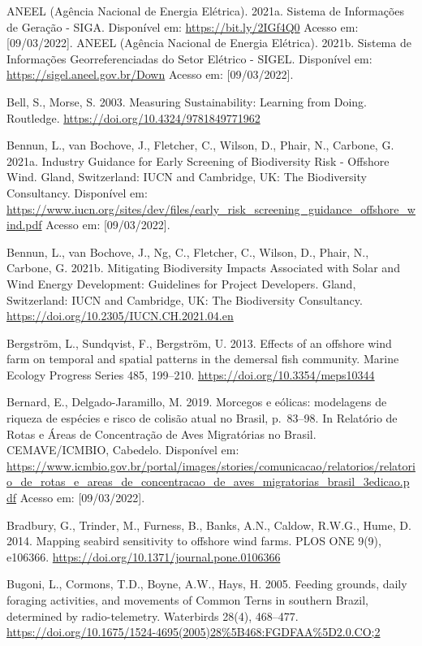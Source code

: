 \documentclass[
  oneside]{scrbook}
\begin{document}
ANEEL (Agência Nacional de Energia Elétrica). 2021a. Sistema de Informações de Geração - SIGA. Disponível em: \url{https://bit.ly/2IGf4Q0} Acesso em: {[}09/03/2022{]}.
ANEEL (Agência Nacional de Energia Elétrica). 2021b. Sistema de Informações Georreferenciadas do Setor Elétrico - SIGEL. Disponível em: \url{https://sigel.aneel.gov.br/Down} Acesso em: {[}09/03/2022{]}.

Bell, S., Morse, S. 2003. Measuring Sustainability: Learning from Doing. Routledge. \url{https://doi.org/10.4324/9781849771962}

Bennun, L., van Bochove, J., Fletcher, C., Wilson, D., Phair, N., Carbone, G. 2021a. Industry Guidance for Early Screening of Biodiversity Risk - Offshore Wind. Gland, Switzerland: IUCN and Cambridge, UK: The Biodiversity Consultancy. Disponível em: \url{https://www.iucn.org/sites/dev/files/early_risk_screening_guidance_offshore_wind.pdf} Acesso em: {[}09/03/2022{]}.

Bennun, L., van Bochove, J., Ng, C., Fletcher, C., Wilson, D., Phair, N., Carbone, G. 2021b. Mitigating Biodiversity Impacts Associated with Solar and Wind Energy Development: Guidelines for Project Developers. Gland, Switzerland: IUCN and Cambridge, UK: The Biodiversity Consultancy. \url{https://doi.org/10.2305/IUCN.CH.2021.04.en}

Bergström, L., Sundqvist, F., Bergström, U. 2013. Effects of an offshore wind farm on temporal and spatial patterns in the demersal fish community. Marine Ecology Progress Series 485, 199--210. \url{https://doi.org/10.3354/meps10344}

Bernard, E., Delgado-Jaramillo, M. 2019. Morcegos e eólicas: modelagens de riqueza de espécies e risco de colisão atual no Brasil, p.~83--98. In Relatório de Rotas e Áreas de Concentração de Aves Migratórias no Brasil. CEMAVE/ICMBIO, Cabedelo. Disponível em: \url{https://www.icmbio.gov.br/portal/images/stories/comunicacao/relatorios/relatorio_de_rotas_e_areas_de_concentracao_de_aves_migratorias_brasil_3edicao.pdf} Acesso em: {[}09/03/2022{]}.

Bradbury, G., Trinder, M., Furness, B., Banks, A.N., Caldow, R.W.G., Hume, D. 2014. Mapping seabird sensitivity to offshore wind farms. PLOS ONE 9(9), e106366. \url{https://doi.org/10.1371/journal.pone.0106366}

Bugoni, L., Cormons, T.D., Boyne, A.W., Hays, H. 2005. Feeding grounds, daily foraging activities, and movements of Common Terns in southern Brazil, determined by radio-telemetry. Waterbirds 28(4), 468--477. \url{https://doi.org/10.1675/1524-4695(2005)28\%5B468:FGDFAA\%5D2.0.CO;2}
\end{document}
